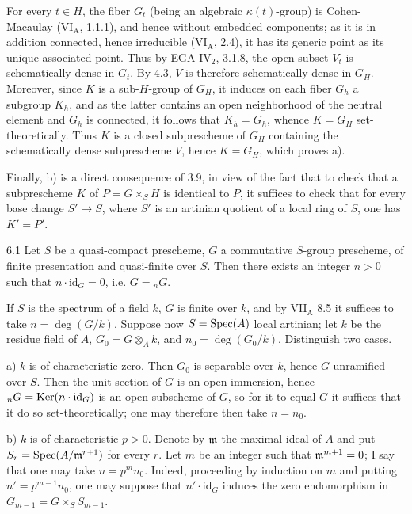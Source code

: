 For every $t\in H$, the fiber $G_t$ (being an algebraic $\kappa(t)$-group) is Cohen-Macaulay (VI$_{\mathrm A}$, 1.1.1), and hence without embedded components; as it is in addition connected, hence irreducible (VI$_{\mathrm A}$, 2.4), it has its generic point as its unique associated point. Thus by EGA IV$_2$, 3.1.8, the open subset $V_t$ is schematically dense in $G_t$. By 4.3, $V$ is therefore schematically dense in $G_H$. Moreover, since $K$ is a sub-$H$-group of $G_H$, it induces on each fiber $G_h$ a subgroup $K_h$, and as the latter contains an open neighborhood of the neutral element and $G_h$ is connected, it follows that $K_h=G_h$, whence $K=G_H$ set-theoretically. Thus $K$ is a closed subprescheme of $G_H$ containing the schematically dense subprescheme $V$, hence $K=G_H$, which proves a).

Finally, b) is a direct consequence of 3.9, in view of the fact that to check that a subprescheme $K$ of $P=G\times_S H$ is identical to $P$, it suffices to check that for every base change $S'\to S$, where $S'$ is an artinian quotient of a local ring of $S$, one has $K'=P'$.

\begin{lemma}{6.1}\label{IX.6.1}
Let $S$ be a quasi-compact prescheme, $G$ a commutative $S$-group prescheme, of finite presentation and quasi-finite over $S$. Then there exists an integer $n>0$ such that $n\cdot\mathrm{id}_G=0$, i.e. $G={}_nG$.
\end{lemma}
If $S$ is the spectrum of a field $k$, $G$ is finite over $k$, and by VII$_{\mathrm A}$ 8.5 it suffices to take $n=\deg(G/k)$. Suppose now $S=\operatorname{Spec}(A)$ local artinian; let $k$ be the residue field of $A$, $G_0=G\otimes_A k$, and $n_0=\deg(G_0/k)$. Distinguish two cases.

a) $k$ is of characteristic zero. Then $G_0$ is separable over $k$, hence $G$ unramified over $S$. Then the unit section of $G$ is an open immersion, hence ${}_nG=\operatorname{Ker}(n\cdot\mathrm{id}_G)$ is an open subscheme of $G$, so for it to equal $G$ it suffices that it do so set-theoretically; one may therefore then take $n=n_0$.

b) $k$ is of characteristic $p>0$. Denote by $\mathfrak m$ the maximal ideal of $A$ and put $S_r=\operatorname{Spec}(A/\mathfrak m^{r+1})$ for every $r$. Let $m$ be an integer such that $\mathfrak m^{m+1}=0$; I say that one may take $n=p^m n_0$. Indeed, proceeding by induction on $m$ and putting $n'=p^{m-1}n_0$, one may suppose that $n'\cdot\mathrm{id}_G$ induces the zero endomorphism in $G_{m-1}=G\times_S S_{m-1}$.

